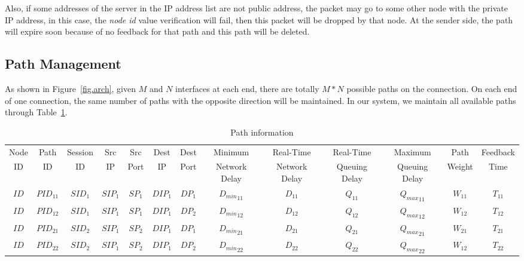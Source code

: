 Also, if some addresses of the server in the IP address list are not public address, the packet may go to some other node with the private IP address, in this case, the \emph{node id} value verification will fail, then this packet will be dropped by that node. At the sender side, the path will expire soon because of no feedback for that path and this path will be deleted. 


\subsection{Path Management}
\label{sec:path}

As shown in Figure~\ref{fig.arch}, given $M$ and $N$ interfaces at each end, there are totally $M*N$ possible paths on the connection. On each end of one connection, the same number of paths with the opposite direction will be maintained. In our system, we maintain all available paths through Table~\ref{tb.pi}.

\begin{table}
\small
\caption{\label{tb.pi}Path information}
\centering
\begin{tabular}{|c|c|c|c|c|c|c|c|c|c|c|c|c|}
\hline
Node &  Path & Session & Src &   Src & Dest & Dest &   Minimum       & Real-Time      & Real-Time      & Maximum       & Path    & Feedback\\
 ID  &   ID  & ID & IP  &  Port &  IP  & Port &  Network Delay  & Network Delay  & Queuing Delay  & Queuing Delay & Weight  & Time\\
\hline
$ID$&${PID}_{11}$&${SID}_{1}$&${SIP}_{1}$&${SP}_{1}$&${DIP}_{1}$&${DP}_{1}$&${D_{min}}_{11}$&$D_{11}$&${Q}_{11}$&${{Q}_{max}}_{11}$&$W_{11}$&$T_{11}$ \\
\hline
$ID$&${PID}_{12}$&${SID}_{1}$&${SIP}_{1}$&${SP}_{1}$&${DIP}_{1}$&${DP}_{2}$&${D_{min}}_{12}$&$D_{12}$&${Q}_{12}$&${{Q}_{max}}_{12}$&$W_{12}$&$T_{12}$ \\
\hline
$ID$&${PID}_{21}$&${SID}_{2}$&${SIP}_{1}$&${SP}_{2}$&${DIP}_{1}$&${DP}_{1}$&${D_{min}}_{21}$&$D_{21}$&${Q}_{21}$&${{Q}_{max}}_{21}$&$W_{21}$&$T_{21}$ \\
\hline
$ID$&${PID}_{22}$&${SID}_{2}$&${SIP}_{1}$&${SP}_{2}$&${DIP}_{1}$&${DP}_{2}$&${D_{min}}_{22}$&$D_{22}$&${Q}_{22}$&${{Q}_{max}}_{22}$&$W_{12}$&$T_{22}$ \\
\hline
\end{tabular}
\end{table}

